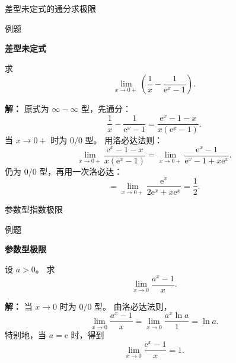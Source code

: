 \documentclass[aspectratio=169,10pt,fontset=fandol]{ctexbeamer}
\newcommand{\ee}{\mathrm{e}}
\begin{document}
\begin{frame}[t,fragile]{差型未定式的通分求极限}
\normalsize
\begin{block}{例题}
{\normalsize
\textbf{差型未定式}\par

求
\[
\lim_{x\to0+}\left(\frac1x-\frac1{\ee^x-1}\right).
\]

}
\end{block}
\pause
{\normalsize
\textbf{解：}
原式为 $\infty-\infty$ 型，先通分：
\[
\frac1x-\frac1{\ee^x-1}
=\frac{\ee^x-1-x}{x(\ee^x-1)}.
\]
当 $x\to0+$ 时为 $0/0$ 型。 用洛必达法则：
\[
\lim_{x\to0+}\frac{\ee^x-1-x}{x(\ee^x-1)}
=\lim_{x\to0+}\frac{\ee^x-1}{\ee^x-1+x\ee^x}.
\]
仍为 $0/0$ 型，再用一次洛必达：
\[
=\lim_{x\to0+}\frac{\ee^x}{2\ee^x+x\ee^x}
=\frac12.
\]

}
\end{frame}
\begin{frame}[t,fragile]{参数型指数极限}
\normalsize
\begin{block}{例题}
{\normalsize
\textbf{参数型极限}\par

设 $a>0$。 求
\[
\lim_{x\to0}\frac{a^x-1}{x}.
\]

}
\end{block}
\pause
{\normalsize
\textbf{解：}
当 $x\to0$ 时为 $0/0$ 型。 由洛必达法则，
\[
\lim_{x\to0}\frac{a^x-1}{x}
=\lim_{x\to0}\frac{a^x\ln a}{1}
=\ln a.
\]
特别地，当 $a=\ee$ 时，得到
\[
\lim_{x\to0}\frac{\ee^x-1}{x}=1.
\]

}
\end{frame}
\end{document}
